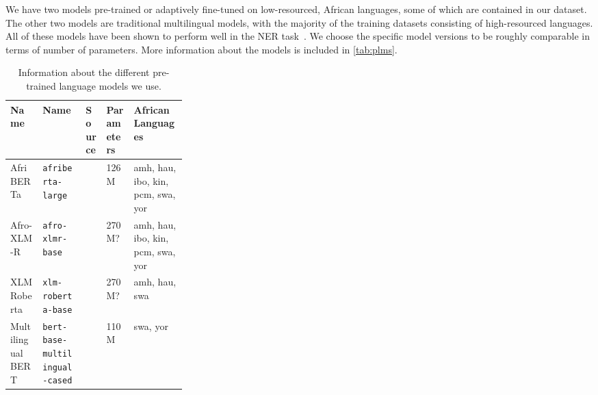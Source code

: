 \documentclass{article}
\newcommand{\afriberta}{AfriBERTa\xspace}
\newcommand{\afroxlmr}{Afro-XLM-R\xspace}
\begin{document}
We have two models pre-trained or adaptively fine-tuned on low-resourced, African languages, some of which are contained in our dataset. The other two models are traditional multilingual models, with the majority of the training datasets consisting of high-resourced languages. All of these models have been shown to perform well in the NER task~\citep{adelani2021MasakhaNER,ogueji2021Small,alabi2022Multilingual}. We choose the specific model versions to be roughly comparable in terms of number of parameters. More information about the models is included in \autoref{tab:plms}.


\begin{table*}[h]
    \centering
    \caption{Information about the different pre-trained language models we use.}
    \label{tab:plms}
    \begin{adjustbox}{width=1\linewidth}
    \begin{tabular}{llllp{0.3\linewidth}}
        \toprule
        Name & Name & Source & Parameters & African Languages \\
        \midrule
        \afriberta & {\texttt{afriberta-large}} & \citet{ogueji2021Small} & 126M  & amh, hau, ibo, kin, pcm, swa, yor \\
        \afroxlmr & \texttt{afro-xlmr-base} & \citet{alabi2022Multilingual} & 270M?  & amh, hau, ibo, kin, pcm, swa, yor \\
        XLM Roberta & \texttt{xlm-roberta-base} & \citet{conneau2019Unsupervised} & 270M?  & amh, hau, swa \\
        Multilingual BERT & \texttt{bert-base-multilingual-cased} & \citet{devlin2019BERT} & 110M  & swa, yor \\
        \bottomrule
    \end{tabular}
    \end{adjustbox}
\end{table*}
\end{document}
